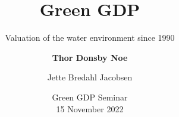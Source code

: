 \usepackage{hyperref}
\usepackage[utf8]{inputenc} %
\usepackage{lmodern,textcomp} %

\usepackage{amssymb}
\usepackage{amsmath}
\usepackage{bm} %
\usepackage{cancel} %
\usepackage[bb=dsserif]{mathalpha} %

\usepackage{appendixnumberbeamer}
\usepackage{epigraph}
\usepackage{multicol}
\usepackage{multirow,array}
\usepackage[super,negative]{nth} %
\usepackage{tcolorbox}




\setcounter{MaxMatrixCols}{10}
\newenvironment{stepenumerate}{\begin{enumerate}[<+->]}{\end{enumerate}}
\newenvironment{stepitemize}{\begin{itemize}[<+->]}{\end{itemize} }
\newenvironment{stepenumeratewithalert}{\begin{enumerate}[<+-| alert@+>]}{\end{enumerate}}
\newenvironment{stepitemizewithalert}{\begin{itemize}[<+-| alert@+>]}{\end{itemize} }


\title[Green GDP: The Water Environment]{Green GDP}
\subtitle{Valuation of the water environment since 1990}
\author[Thor Donsby Noe]{\textbf{Thor Donsby Noe} \and Jette Bredahl Jacobsen}
\date[15 November 2022]{Green GDP Seminar\\
      15 November 2022}

% 
